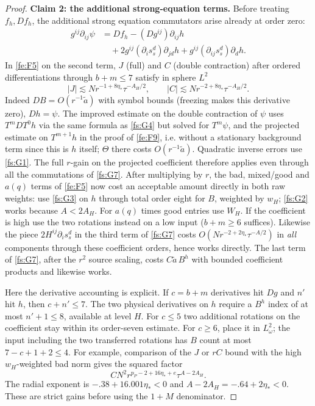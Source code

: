 \begin{proof}
\par\medskip\noindent\textbf{Claim 2: the additional strong-equation terms.}\label{fs:claim-strong}\quad
Before treating \(f_h,D f_h\), the additional strong equation commutators arise already at order zero:
\begin{equation}
\label{fs:G7}
\begin{aligned}
g^{ij}\partial_{ij}\psi
   &=D f_h-(Dg^{ij})\partial_{ij}h\\
   &\quad+2g^{ij}(\partial_i s_s^d)\partial_{jd}h
             +g^{ij}(\partial_{ij}s_s^d)\partial_d h .
\end{aligned}
\end{equation}
In \eqref{fe:F5} on the second term, \(J\) (full) and \(C\) (double contraction) after ordered differentiations through \(b+m\le7\) satisfy in sphere \(L^2\)
\[
           |J|\lesssim N r^{-1+8\eta_*}\tau^{-A_H/2},\qquad
           |C|\lesssim N r^{-2+8\eta_*}\tau^{-A_H/2}.
\]
Indeed \(D B=O(r^{-1}\widetilde a)\) with symbol bounds (freezing makes this derivative zero), \(D h=\psi\). The improved estimate on the double contraction of \(\psi\) uses \(T^m D T^0 h\) via the same formula as \eqref{fs:G4} but solved for \(T^m\psi\), and the projected estimate on \(T^{m+1}h\) in the proof of \eqref{fe:F9}, i.e. without a stationary background term since this is \(h\) itself; \(\Theta\) there costs \(O(r^{-1}\widetilde a)\). Quadratic inverse errors use \eqref{fs:G1}. The full \(r\)-gain on the projected coefficient therefore applies even through all the commutations of \eqref{fs:G7}. After multiplying by \(r\), the bad, mixed/good and \(a(q)\) terms of \eqref{fe:F5} now cost an acceptable amount directly in both raw weights: use \eqref{fs:G3} on \(h\) through total order eight for \(B\), weighted by \(w_H\); \eqref{fs:G2} works because \(A<2A_H\). For \(a(q)\) times good entries use \(W_H\). If the coefficient is high use the two rotations instead on a low input (\(b+m\ge6\) suffices). Likewise the piece \(2H^{ij}\partial_i s_s^d\) in the third term of \eqref{fs:G7} costs \(O(N r^{-2+2\eta_*}\tau^{-A/2})\) in \emph{all} components through these coefficient orders, hence works directly. The last term of \eqref{fs:G7}, after the \(r^2\) source scaling, costs \(C\widetilde a\, B^h\) with bounded coefficient products and likewise works.

Here the derivative accounting is explicit.  If $c=b+m$ derivatives
hit $Dg$ and $n'$ hit $h$, then $c+n'\le7$.
The two physical derivatives on $h$ require a $B^h$ index of at most
$n'+1\le8$, available at level $H$.  For $c\le5$ two additional
rotations on the coefficient stay within its order-seven estimate.
For $c\ge6$, place it in $L^2_\omega$; the input including the two
transferred rotations has $B$ count at most $7-c+1+2\le4$.
For example, comparison of the $J$ or $rC$ bound with the high
$w_H$-weighted bad norm gives the squared factor
\[
 C N^2 r^{p_P-2+16\eta_*+e}\tau^{A-2A_H}.
\]
The radial exponent is $-.38+16.001\eta_*<0$ and
$A-2A_H=-.64+2\eta_*<0$.  These are strict gains before using
the $1+M$ denominator.


\end{proof}
